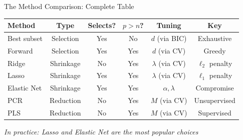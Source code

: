 \documentclass[aspectratio=169, 11pt]{beamer}
\begin{document}
\begin{frame}{The Method Comparison: Complete Table}
\begin{center}
\footnotesize
\begin{tabular}{lccccc}
\toprule
Method & Type & Selects? & $p > n$? & Tuning & Key \\
\midrule
Best subset & Selection & \textcolor{softgreen}{Yes} & \textcolor{softred}{No} & $d$ (via BIC) & Exhaustive \\
Forward & Selection & \textcolor{softgreen}{Yes} & \textcolor{softgreen}{Yes} & $d$ (via CV) & Greedy \\
Ridge & Shrinkage & \textcolor{softred}{No} & \textcolor{softgreen}{Yes} & $\lambda$ (via CV) & $\ell_2$ penalty \\
Lasso & Shrinkage & \textcolor{softgreen}{Yes} & \textcolor{softgreen}{Yes} & $\lambda$ (via CV) & $\ell_1$ penalty \\
Elastic Net & Shrinkage & \textcolor{softgreen}{Yes} & \textcolor{softgreen}{Yes} & $\alpha, \lambda$ & Compromise \\
PCR & Reduction & \textcolor{softred}{No} & \textcolor{softgreen}{Yes} & $M$ (via CV) & Unsupervised \\
PLS & Reduction & \textcolor{softred}{No} & \textcolor{softgreen}{Yes} & $M$ (via CV) & Supervised \\
\bottomrule
\end{tabular}
\normalsize
\end{center}
\vspace{0.3em}
\centering
\textit{In practice: Lasso and Elastic Net are the most popular choices}
\end{frame}
\end{document}

